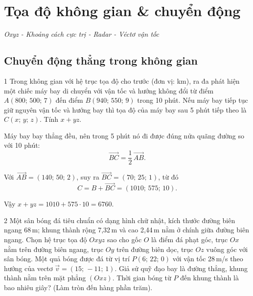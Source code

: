 
\chapter{Tọa độ không gian \& chuyển động}
\begin{center}
  \textit{\color{ForumDarkGray}Oxyz - Khoảng cách cực trị - Radar - Véctơ vận tốc}
\end{center}

\section{Chuyển động thẳng trong không gian}

\begin{baitoan}{1 \hfill {}}
Trong không gian với hệ trục tọa độ cho trước (đơn vị: km), ra đa phát hiện một chiếc máy bay di chuyển với vận tốc và hướng không đổi từ điểm $A(800;\,500;\,7)$ đến điểm $B(940;\,550;\,9)$ trong 10 phút. Nếu máy bay tiếp tục giữ nguyên vận tốc và hướng bay thì tọa độ của máy bay sau 5 phút tiếp theo là $C(x;\,y;\,z)$. Tính $x + yz$.
\end{baitoan}

\begin{loigiai}
Máy bay bay thẳng đều, nên trong 5 phút nó đi được đúng nửa quãng đường so với 10 phút:
\[ \overrightarrow{BC} = \frac{1}{2}\,\overrightarrow{AB}. \]

Với $\overrightarrow{AB} = (140;\,50;\,2)$, suy ra $\overrightarrow{BC} = (70;\,25;\,1)$, từ đó
\[ C = B + \overrightarrow{BC} = (1010;\,575;\,10). \]

Vậy $x + yz = 1010 + 575 \cdot 10 = \boxed{6760}$.
\end{loigiai}

\separator

\begin{baitoan}{2 \hfill {}}
Một sân bóng đá tiêu chuẩn có dạng hình chữ nhật, kích thước đường biên ngang 68\,m; khung thành rộng 7,32\,m và cao 2,44\,m nằm ở chính giữa đường biên ngang. Chọn hệ trục tọa độ $Oxyz$ sao cho gốc $O$ là điểm đá phạt góc, trục $Ox$ nằm trên đường biên ngang, trục $Oy$ trên đường biên dọc, trục $Oz$ vuông góc với sân bóng. Một quả bóng được đá từ vị trí $P(6;\,22;\,0)$ với vận tốc 28\,m/s theo hướng của vectơ $\vec{v} = (15;\,-11;\,1)$. Giả sử quỹ đạo bay là đường thẳng, khung thành nằm trên mặt phẳng $(Oxz)$. Thời gian bóng từ $P$ đến khung thành là bao nhiêu giây? (Làm tròn đến hàng phần trăm).
\end{baitoan}

